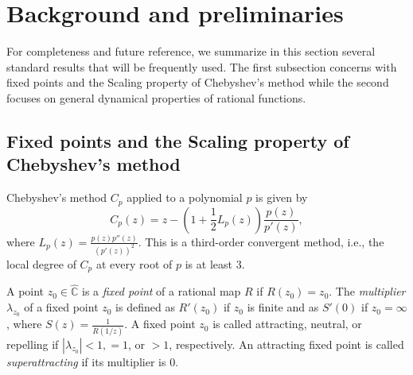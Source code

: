 \documentclass[12pt]{article}
\begin{document}
\section{Background and preliminaries}\label{S2_prelim}
For completeness and future reference, we summarize in this section several standard results that will be frequently used. The first subsection concerns with fixed points and the Scaling property of Chebyshev's method while the second focuses on  general dynamical properties of rational functions.
\subsection{Fixed points and the Scaling property of Chebyshev's method}
Chebyshev's method $C_p$ applied to a polynomial $p$ is given by
\begin{equation}\label{Formula-C_p}
	C_p(z)=z-\left(1+\frac{1}{2}L_p(z)\right)\frac{p(z)}{p'(z)},
\end{equation}
where $L_p(z)=\frac{p(z)p''(z)}{(p'(z))^2}.$
This is a third-order convergent method, i.e., the local degree of $C_p$ at every root of $p$ is at least $3$. 
\par 

A point $z_0 \in \widehat{\mathbb{C}}$ is a \textit{fixed point} of a rational map $R$ if $R(z_0)=z_0$.  
The \textit{multiplier} $\lambda_{z_0}$ of a fixed point $z_0$ is defined as $R'(z_0)$ if $z_0$ is finite and as $S'(0)$ if $z_0=\infty$, where $S(z)=\tfrac{1}{R(1/z)}$. A fixed point $z_0$ is called attracting, neutral, or repelling if $|\lambda_{z_0}|<1, =1$, or $>1$, respectively.
An attracting fixed point is called \textit{superattracting} if its multiplier is $0$. 
\end{document}
